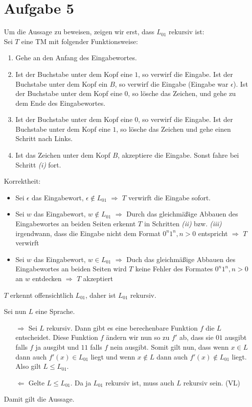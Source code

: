 \documentclass[a4paper,11pt]{scrartcl}
\begin{document}
	\section*{Aufgabe 5}
	Um die Aussage zu beweisen, zeigen wir erst, dass $L_{01}$ rekursiv ist:\\
	Sei $T$ eine TM mit folgender Funktionsweise:
	\begin{enumerate}
	\item Gehe an den Anfang des Eingabewortes.
	\item Ist der Buchstabe unter dem Kopf eine $1$, so verwirf die Eingabe. Ist der Buchstabe unter dem Kopf ein $B$, so verwirf die Eingabe (Eingabe war $\epsilon$). Ist der Buchstabe unter dem Kopf eine $0$, so lösche das Zeichen, und gehe zu dem Ende des Eingabewortes.
	\item Ist der Buchstabe unter dem Kopf eine $0$, so verwirf die Eingabe. Ist der Buchstabe unter dem Kopf eine $1$, so lösche das Zeichen und gehe einen Schritt nach Links.
	\item Ist das Zeichen unter dem Kopf $B$, akzeptiere die Eingabe. Sonst fahre bei Schritt \textit{(i)} fort.
	\end{enumerate}
	Korrektheit:
	\begin{itemize}
	\item Sei $\epsilon$ das Eingabewort, $\epsilon \not\in L_{01}$ $\Rightarrow$ $T$ verwirft die Eingabe sofort.
	\item Sei $w$ das Eingabewort, $w \not\in L_{01}$ $\Rightarrow$ Durch das gleichmäßige Abbauen des Eingabewortes an beiden Seiten erkennt $T$ in Schritten \textit{(ii)} bzw. \textit{(iii)} irgendwann, dass die Eingabe nicht dem Format $0^n1^n, n>0$ entspricht $\Rightarrow$ $T$ verwirft
	\item Sei $w$ das Eingabewort, $w \in L_{01}$ $\Rightarrow$ Duch das gleichmäßige Abbauen des Eingabewortes an beiden Seiten wird $T$ keine Fehler des Formates $0^n1^n, n>0$ an $w$ entdecken $\Rightarrow$ $T$ akzeptiert
	\end{itemize}
	$T$ erkennt offensichtlich $L_{01}$, daher ist $L_{01}$ rekursiv.	
	
	Sei nun $L$ eine Sprache.
	\begin{itemize}
	\item[$\Rightarrow$] Sei $L$ rekursiv. Dann gibt es eine berechenbare Funktion $f$ die $L$ entscheidet. Diese Funktion $f$ ändern wir nun so zu $f'$ ab, dass sie $01$ ausgibt falls $f$ ja ausgibt und $11$ falls $f$ nein ausgibt. Somit gilt nun, dass wenn $x \in L$ dann auch $f'(x) \in L_{01}$ liegt und wenn $x \not \in L$ dann auch $f'(x) \not \in L_{01}$ liegt. Also gilt $L \leq L_{01}$.
	\item[$\Leftarrow$] Gelte $L \leq L_{01}$. Da ja $L_{01}$ rekursiv ist, muss auch $L$ rekursiv sein. (VL)
	\end{itemize}
	Damit gilt die Aussage.
	
\end{document}
